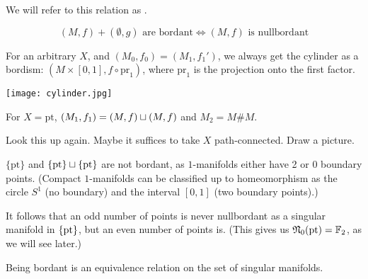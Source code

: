 \documentclass[a4paper,11pt]{article}
\begin{document}
We will refer to this relation as .

\begin{remark}
    \[(M,f)+(\emptyset,g) \text{ are bordant} \iff (M,f) \text{ is nullbordant}\]
\end{remark}

\begin{example}[Cylinder]\label{cylinder bordism}
    For an arbitrary \(X\), and \((M_0,f_0)=(M_1,f_1')\), we always get the cylinder as a bordism: \((M\times[0,1],f\circ\mathrm{pr}_1)\), where \(\mathrm{pr}_1\) is the projection onto the first factor.
    \begin{center}
        \texttt{[image: cylinder.jpg]}
    \end{center}
\end{example}

\begin{example}
    For \(X=\mathrm{pt}\), \((M_1,f_1)=(M,f)\sqcup (M,f)\) and \(M_2=M\# M\).
\end{example}
Look this up again. Maybe it suffices to take \(X\) path-connected. Draw a picture.

\begin{nonex}
    \(\{\mathrm{pt}\}\) and \(\{\mathrm{pt}\}\sqcup\{\mathrm{pt}\}\) are not bordant, as \(1\)-manifolds either have 2 or 0 boundary points. (Compact \(1\)-manifolds can be classified up to homeomorphism as the circle \(S^1\) (no boundary) and the interval \([0,1]\) (two boundary points).)
\end{nonex}

\begin{remark}
     It follows that an odd number of points is never nullbordant as a singular manifold in \(\{\mathrm{pt}\}\), but an even number of points is. (This gives us \(\mathfrak{N}_0(\mathrm{pt})=\mathbb{F}_2\), as we will see later.)
\end{remark}


\begin{proposition}\cite[II, Satz 1.4]{brocker}
    Being bordant is an equivalence relation on the set of singular manifolds.
\end{proposition}
\end{document}
